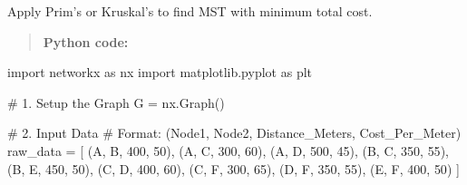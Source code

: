 \documentclass[
  letterpaper,
  DIV=11,
  numbers=noendperiod]{scrreprt}
\newenvironment{Shaded}{\begin{snugshade}}{\end{snugshade}}
\newcommand{\CommentTok}[1]{\textcolor[rgb]{0.37,0.37,0.37}{#1}}
\newcommand{\DecValTok}[1]{\textcolor[rgb]{0.68,0.00,0.00}{#1}}
\newcommand{\ImportTok}[1]{\textcolor[rgb]{0.00,0.46,0.62}{#1}}
\newcommand{\NormalTok}[1]{\textcolor[rgb]{0.00,0.23,0.31}{#1}}
\newcommand{\OperatorTok}[1]{\textcolor[rgb]{0.37,0.37,0.37}{#1}}
\newcommand{\StringTok}[1]{\textcolor[rgb]{0.13,0.47,0.30}{#1}}
\begin{document}
Apply Prim's or Kruskal's to find MST with minimum total cost.

\begin{quote}
\textbf{Python code:}
\end{quote}

\begin{Shaded}
\begin{Highlighting}[]
\ImportTok{import}\NormalTok{ networkx }\ImportTok{as}\NormalTok{ nx}
\ImportTok{import}\NormalTok{ matplotlib.pyplot }\ImportTok{as}\NormalTok{ plt}

\CommentTok{\# 1. Setup the Graph}
\NormalTok{G }\OperatorTok{=}\NormalTok{ nx.Graph()}

\CommentTok{\# 2. Input Data}
\CommentTok{\# Format: (Node1, Node2, Distance\_Meters, Cost\_Per\_Meter)}
\NormalTok{raw\_data }\OperatorTok{=}\NormalTok{ [}
\NormalTok{    (}\StringTok{\textquotesingle{}A\textquotesingle{}}\NormalTok{, }\StringTok{\textquotesingle{}B\textquotesingle{}}\NormalTok{, }\DecValTok{400}\NormalTok{, }\DecValTok{50}\NormalTok{),}
\NormalTok{    (}\StringTok{\textquotesingle{}A\textquotesingle{}}\NormalTok{, }\StringTok{\textquotesingle{}C\textquotesingle{}}\NormalTok{, }\DecValTok{300}\NormalTok{, }\DecValTok{60}\NormalTok{),}
\NormalTok{    (}\StringTok{\textquotesingle{}A\textquotesingle{}}\NormalTok{, }\StringTok{\textquotesingle{}D\textquotesingle{}}\NormalTok{, }\DecValTok{500}\NormalTok{, }\DecValTok{45}\NormalTok{),}
\NormalTok{    (}\StringTok{\textquotesingle{}B\textquotesingle{}}\NormalTok{, }\StringTok{\textquotesingle{}C\textquotesingle{}}\NormalTok{, }\DecValTok{350}\NormalTok{, }\DecValTok{55}\NormalTok{),}
\NormalTok{    (}\StringTok{\textquotesingle{}B\textquotesingle{}}\NormalTok{, }\StringTok{\textquotesingle{}E\textquotesingle{}}\NormalTok{, }\DecValTok{450}\NormalTok{, }\DecValTok{50}\NormalTok{),}
\NormalTok{    (}\StringTok{\textquotesingle{}C\textquotesingle{}}\NormalTok{, }\StringTok{\textquotesingle{}D\textquotesingle{}}\NormalTok{, }\DecValTok{400}\NormalTok{, }\DecValTok{60}\NormalTok{),}
\NormalTok{    (}\StringTok{\textquotesingle{}C\textquotesingle{}}\NormalTok{, }\StringTok{\textquotesingle{}F\textquotesingle{}}\NormalTok{, }\DecValTok{300}\NormalTok{, }\DecValTok{65}\NormalTok{),}
\NormalTok{    (}\StringTok{\textquotesingle{}D\textquotesingle{}}\NormalTok{, }\StringTok{\textquotesingle{}F\textquotesingle{}}\NormalTok{, }\DecValTok{350}\NormalTok{, }\DecValTok{55}\NormalTok{),}
\NormalTok{    (}\StringTok{\textquotesingle{}E\textquotesingle{}}\NormalTok{, }\StringTok{\textquotesingle{}F\textquotesingle{}}\NormalTok{, }\DecValTok{400}\NormalTok{, }\DecValTok{50}\NormalTok{)}
\NormalTok{]}


\end{Highlighting}
\end{Shaded}
\end{document}

